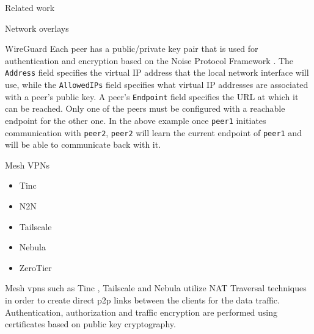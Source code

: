 \begin{frame}[fragile]{Related work}
\begin{block}{Network overlays}
\begin{block}{WireGuard}
Each peer has a public/private key pair that is used for authentication
and encryption based on the Noise Protocol Framework
\autocite{noiseDocs}. The \texttt{Address} field specifies the virtual
IP address that the local network interface will use, while the
\texttt{AllowedIPs} field specifies what virtual IP addresses are
associated with a peer's public key. A peer's \texttt{Endpoint} field
specifies the URL at which it can be reached. Only one of the peers must
be configured with a reachable endpoint for the other one. In the above
example once \texttt{peer1} initiates communication with \texttt{peer2},
\texttt{peer2} will learn the current endpoint of \texttt{peer1} and
will be able to communicate back with it.
\end{block}

\begin{block}{Mesh VPNs}
\protect\hypertarget{thesis__020-related-work.md__mesh-vpns}{}
\begin{itemize}
\tightlist
\item
  Tinc
\item
  N2N
\item
  Tailscale
\item
  Nebula
\item
  ZeroTier
\end{itemize}

Mesh \glspl{vpn} such as Tinc \autocite{tincDocs}, Tailscale
\autocite{tailscaleDocs} and Nebula \autocite{nebulaDocs} utilize NAT
Traversal techniques in order to create direct \gls{p2p} links between
the clients for the data traffic. Authentication, authorization and
traffic encryption are performed using certificates based on public key
cryptography.


\end{block}
\end{block}
\end{frame}
